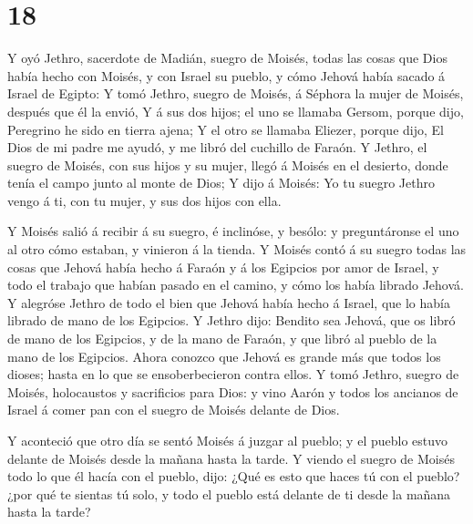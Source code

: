 \hypertarget{section-17}{%
\section{18}\label{section-17}}

 Y oyó Jethro, sacerdote de Madián, suegro de Moisés, todas
las cosas que Dios había hecho con Moisés, y con Israel su pueblo, y
cómo Jehová había sacado á Israel de Egipto:  Y tomó Jethro,
suegro de Moisés, á Séphora la mujer de Moisés, después que él la envió,
 Y á sus dos hijos; el uno se llamaba Gersom, porque dijo,
Peregrino he sido en tierra ajena;  Y el otro se llamaba
Eliezer, porque dijo, El Dios de mi padre me ayudó, y me libró del
cuchillo de Faraón.  Y Jethro, el suegro de Moisés, con sus
hijos y su mujer, llegó á Moisés en el desierto, donde tenía el campo
junto al monte de Dios;  Y dijo á Moisés: Yo tu suegro
Jethro vengo á ti, con tu mujer, y sus dos hijos con ella.

 Y Moisés salió á recibir á su suegro, é inclinóse, y
besólo: y preguntáronse el uno al otro cómo estaban, y vinieron á la
tienda.  Y Moisés contó á su suegro todas las cosas que
Jehová había hecho á Faraón y á los Egipcios por amor de Israel, y todo
el trabajo que habían pasado en el camino, y cómo los había librado
Jehová.  Y alegróse Jethro de todo el bien que Jehová había
hecho á Israel, que lo había librado de mano de los Egipcios.
 Y Jethro dijo: Bendito sea Jehová, que os libró de mano de
los Egipcios, y de la mano de Faraón, y que libró al pueblo de la mano
de los Egipcios.  Ahora conozco que Jehová es grande más
que todos los dioses; hasta en lo que se ensoberbecieron contra ellos.
 Y tomó Jethro, suegro de Moisés, holocaustos y sacrificios
para Dios: y vino Aarón y todos los ancianos de Israel á comer pan con
el suegro de Moisés delante de Dios.

 Y aconteció que otro día se sentó Moisés á juzgar al
pueblo; y el pueblo estuvo delante de Moisés desde la mañana hasta la
tarde.  Y viendo el suegro de Moisés todo lo que él hacía
con el pueblo, dijo: ¿Qué es esto que haces tú con el pueblo? ¿por qué
te sientas tú solo, y todo el pueblo está delante de ti desde la mañana
hasta la tarde?

